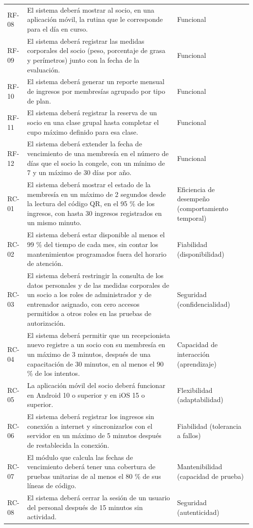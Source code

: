 {\begin{longtable}{@{}L{0.07\textwidth}L{0.62\textwidth}L{0.25\textwidth}@{}}
RF-08 & El sistema deberá mostrar al socio, en una aplicación móvil, la rutina que le corresponde para el día en curso. & Funcional\\
RF-09 & El sistema deberá registrar las medidas corporales del socio (peso, porcentaje de grasa y perímetros) junto con la fecha de la evaluación. & Funcional\\
RF-10 & El sistema deberá generar un reporte mensual de ingresos por membresías agrupado por tipo de plan. & Funcional\\
RF-11 & El sistema deberá registrar la reserva de un socio en una clase grupal hasta completar el cupo máximo definido para esa clase. & Funcional\\
RF-12 & El sistema deberá extender la fecha de vencimiento de una membresía en el número de días que el socio la congele, con un mínimo de 7 y un máximo de 30 días por año. & Funcional\\
RC-01 & El sistema deberá mostrar el estado de la membresía en un máximo de 2 segundos desde la lectura del código QR, en el 95 \% de los ingresos, con hasta 30 ingresos registrados en un mismo minuto. & Eficiencia de desempeño (comportamiento temporal)\\
RC-02 & El sistema deberá estar disponible al menos el 99 \% del tiempo de cada mes, sin contar los mantenimientos programados fuera del horario de atención. & Fiabilidad (disponibilidad)\\
RC-03 & El sistema deberá restringir la consulta de los datos personales y de las medidas corporales de un socio a los roles de administrador y de entrenador asignado, con cero accesos permitidos a otros roles en las pruebas de autorización. & Seguridad (confidencialidad)\\
RC-04 & El sistema deberá permitir que un recepcionista nuevo registre a un socio con su membresía en un máximo de 3 minutos, después de una capacitación de 30 minutos, en al menos el 90 \% de los intentos. & Capacidad de interacción (aprendizaje)\\
RC-05 & La aplicación móvil del socio deberá funcionar en Android 10 o superior y en iOS 15 o superior. & Flexibilidad (adaptabilidad)\\
RC-06 & El sistema deberá registrar los ingresos sin conexión a internet y sincronizarlos con el servidor en un máximo de 5 minutos después de restablecida la conexión. & Fiabilidad (tolerancia a fallos)\\
RC-07 & El módulo que calcula las fechas de vencimiento deberá tener una cobertura de pruebas unitarias de al menos el 80 \% de sus líneas de código. & Mantenibilidad (capacidad de prueba)\\
RC-08 & El sistema deberá cerrar la sesión de un usuario del personal después de 15 minutos sin actividad. & Seguridad (autenticidad)\\
\bottomrule
\end{longtable}
}
